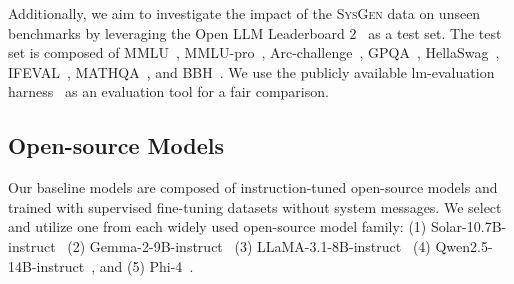 Additionally, we aim to investigate the impact of the \textsc{SysGen} data on unseen benchmarks by leveraging the Open LLM Leaderboard 2~\citep{myrzakhan2024open} as a test set.
The test set is composed of MMLU~\citep{hendrycks2020measuring}, MMLU-pro~\citep{wang2024mmlu}, Arc-challenge~\citep{clark2018think}, GPQA~\citep{rein2023gpqa}, HellaSwag~\citep{zellers2019hellaswag}, IFEVAL~\citep{zhou2023instruction}, MATHQA~\citep{amini-etal-2019-mathqa}, and BBH~\citep{suzgun2023challenging}.
We use the publicly available lm-evaluation harness~\citep{eval-harness} as an evaluation tool for a fair comparison.



\subsection{Open-source Models}
Our baseline models are composed of instruction-tuned open-source models and trained with supervised fine-tuning datasets without system messages.
We select and utilize one from each widely used open-source model family: 
(1) Solar-10.7B-instruct~\citep{kim-etal-2024-solar} (2) Gemma-2-9B-instruct~\citep{team2024gemma} (3) LLaMA-3.1-8B-instruct~\citep{meta2024introducing} (4) Qwen2.5-14B-instruct~\citep{yang2025qwen2}, and (5) Phi-4~\citep{abdin2024phi}.
